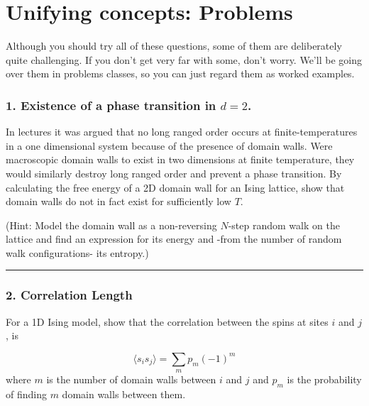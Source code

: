 \documentclass[
  letterpaper,
  enabledeprecatedfontcommands]{report}
\begin{document}
\chapter*{Unifying concepts: Problems}\label{problems}


Although you should try all of these questions, some of them are
deliberately quite challenging. If you don't get very far with some,
don't worry. We'll be going over them in problems classes, so you can
just regard them as worked examples.

\subsection*{\texorpdfstring{1. Existence of a phase transition in
\(d=2\).}{1. Existence of a phase transition in d=2.}}\label{existence-of-a-phase-transition-in-d2.}

In lectures it was argued that no long ranged order occurs at
finite-temperatures in a one dimensional system because of the presence
of domain walls. Were macroscopic domain walls to exist in two
dimensions at finite temperature, they would similarly destroy long
ranged order and prevent a phase transition. By calculating the free
energy of a 2D domain wall for an Ising lattice, show that domain walls
do not in fact exist for sufficiently low \(T\).

(Hint: Model the domain wall as a non-reversing \(N\)-step random walk
on the lattice and find an expression for its energy and -from the
number of random walk configurations- its entropy.)

\begin{center}\rule{0.5\linewidth}{0.5pt}\end{center}

\subsection*{2. Correlation Length}\label{correlation-length}

For a 1D Ising model, show that the correlation between the spins at
sites \(i\) and \(j\), is

\[\langle s_i s_j\rangle =\sum_m p_m(-1)^m\] where \(m\) is the number
of domain walls between \(i\) and \(j\) and \(p_m\) is the probability
of finding \(m\) domain walls between them.
\end{document}

